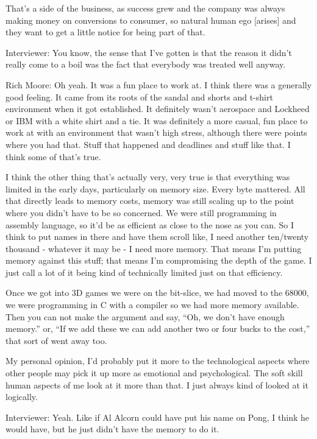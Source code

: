 That's a side of the business, as success grew and the company was always making money on conversions to consumer, so natural human ego [arises] and they want to get a little notice for being part of that.

\textcolor{interviewer}{Interviewer:} You know, the sense that I've gotten is that the reason it didn't really come to a boil was the fact that everybody was treated well anyway.

\textcolor{interviewee}{Rich Moore:} Oh yeah. It was a fun place to work at. I think there was a generally good feeling. It came from its roots of the sandal and shorts and t-shirt environment when it got established. It definitely wasn't aerospace and Lockheed or IBM with a white shirt and a tie. It was definitely a more casual, fun place to work at with an environment that wasn't high stress, although there were points where you had that. Stuff that happened and deadlines and stuff like that. I think some of that's true. 

I think the other thing that's actually very, very true is that everything was limited in the early days, particularly on memory size. Every byte mattered. All that directly leads to memory costs, memory was still scaling up to the point where you didn't have to be so concerned. We were still programming in assembly language, so it'd be as efficient as close to the nose as you can. So I think to put names in there and have them scroll like, I need another ten/twenty thousand - whatever it may be - I need more memory. That means I’m putting memory against this stuff; that means I’m compromising the depth of the game. I just call a lot of it being kind of technically limited just on that efficiency. 

Once we got into 3D games we were on the bit-slice, we had moved to the 68000, we were programming in C with a compiler so we had more memory available. Then you can not make the argument and say, “Oh, we don't have enough memory.” or, “If we add these we can add another two or four bucks to the cost,” that sort of went away too.

My personal opinion, I'd probably put it more to the technological aspects where other people may pick it up more as emotional and psychological. The soft skill human aspects of me look at it more than that. I just always kind of looked at it logically.

\textcolor{interviewer}{Interviewer:} Yeah. Like if Al Alcorn could have put his name on Pong, I think he would have, but he just didn't have the memory to do it.

